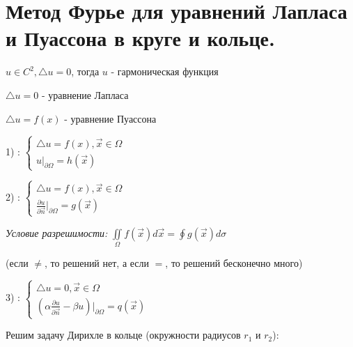 \chapter{Метод Фурье для уравнений Лапласа и Пуассона в круге и кольце.}
\label{cha:13}

\begin{definition}
	$u \in C^2, \triangle u = 0$, тогда $u$ - гармоническая функция
\end{definition}

\begin{definition}
	$\triangle u = 0$ - уравнение Лапласа
\end{definition}

\begin{definition}
	$\triangle u = f(x)$ - уравнение Пуассона
\end{definition}

1) : 
	$\begin{cases}
		\triangle u = f(x),  \vec{x} \in \Omega \\
		u|_{\partial \Omega} = h (\vec{x})
	\end{cases}$

\vspace{0.4cm}
2) : 
	$\begin{cases}
		\triangle u = f(x),  \vec{x} \in \Omega \\
		\frac{\partial u}{\partial \vec{n}}|_{\partial \Omega} = g (\vec{x})
	\end{cases}$

	\textit{Условие разрешимости:} 
		$\iint \limits_{\Omega} f(\vec{x}) d \vec{x} = \oint g(\vec{x}) d \sigma $

	(если $\not =$, то решений нет, а если $=$, то решений бесконечно много)

\vspace{0.4cm}
3) : 
	$\begin{cases}
		\triangle u = 0,  \vec{x} \in \Omega \\
		(\alpha \frac{\partial u}{\partial \vec{n}} - \beta u)|_{\partial \Omega} = q (\vec{x})
	\end{cases}$

\vspace{0.5cm}
Решим задачу Дирихле в кольце (окружности радиусов $r_1$ и $r_2$):


